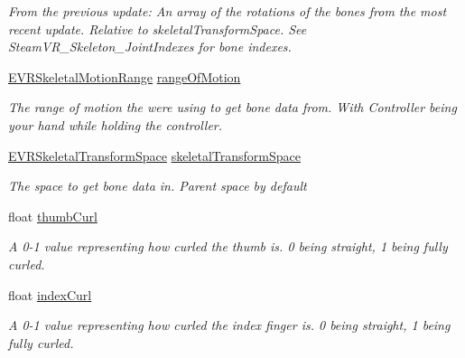 \begin{DoxyCompactItemize}
\begin{DoxyCompactList}\small\item\em From the previous update\+: An array of the rotations of the bones from the most recent update. Relative to skeletal\+Transform\+Space. See Steam\+V\+R\+\_\+\+Skeleton\+\_\+\+Joint\+Indexes for bone indexes. \end{DoxyCompactList}\item 
\mbox{\hyperlink{namespace_valve_1_1_v_r_affc8d18345f8f5d36f1ae7b4ce534500}{E\+V\+R\+Skeletal\+Motion\+Range}} \mbox{\hyperlink{interface_valve_1_1_v_r_1_1_i_steam_v_r___action___skeleton___source_ade889c5dd86319d30851f4f7cc85d742}{range\+Of\+Motion}}
\begin{DoxyCompactList}\small\item\em The range of motion the we\textquotesingle{}re using to get bone data from. With Controller being your hand while holding the controller. \end{DoxyCompactList}\item 
\mbox{\hyperlink{namespace_valve_1_1_v_r_a916744fb3fc7b8e8ba224fba9bee6de4}{E\+V\+R\+Skeletal\+Transform\+Space}} \mbox{\hyperlink{interface_valve_1_1_v_r_1_1_i_steam_v_r___action___skeleton___source_ab0ef346413ba57f7a65bd0a8b138b2fe}{skeletal\+Transform\+Space}}
\begin{DoxyCompactList}\small\item\em The space to get bone data in. Parent space by default \end{DoxyCompactList}\item 
float \mbox{\hyperlink{interface_valve_1_1_v_r_1_1_i_steam_v_r___action___skeleton___source_a0d7a2a786bcba05e32bcdc2c37e397a6}{thumb\+Curl}}
\begin{DoxyCompactList}\small\item\em A 0-\/1 value representing how curled the thumb is. 0 being straight, 1 being fully curled. \end{DoxyCompactList}\item 
float \mbox{\hyperlink{interface_valve_1_1_v_r_1_1_i_steam_v_r___action___skeleton___source_a8ce410f03818d0f9c6110578e1ad1464}{index\+Curl}}
\begin{DoxyCompactList}\small\item\em A 0-\/1 value representing how curled the index finger is. 0 being straight, 1 being fully curled. \end{DoxyCompactList}\item 

\end{DoxyCompactItemize}
